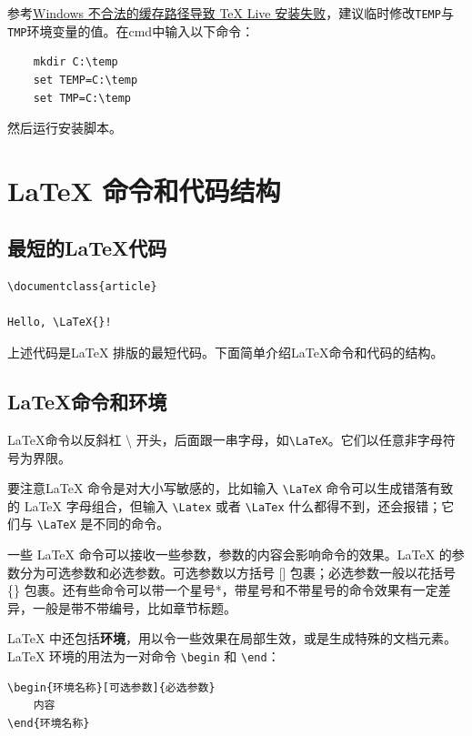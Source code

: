 参考\href{https://syvshc.github.io/2021-04-07-illegal-temp-cause-tlinstall-failure/}{Windows 不合法的缓存路径导致 TeX Live 安装失败}，建议临时修改\lstinline{TEMP}与\lstinline{TMP}环境变量的值。在cmd中输入以下命令：
\begin{lstlisting}
    mkdir C:\temp
    set TEMP=C:\temp
    set TMP=C:\temp
\end{lstlisting}

然后运行安装脚本。

\section{\LaTeX{} 命令和代码结构}\label{sec:latexstructure}
\subsection{最短的\LaTeX{}代码}\label{subsec:shortlatexcode}
\begin{lstlisting}
\documentclass{article}

Hello, \LaTeX{}!

\end{lstlisting}

上述代码是\LaTeX{} 排版的最短代码。下面简单介绍\LaTeX{}命令和代码的结构。

\subsection{\LaTeX{}命令和环境}\label{subsec:latexcommands}

\LaTeX{}命令以反斜杠 \hspace{0.2em}\textbackslash\hspace{0.2em} 开头，后面跟一串字母，如\lstinline{\LaTeX}。它们以任意非字母符号为界限。

要注意\LaTeX{} 命令是对大小写敏感的，比如输入 \lstinline{\LaTeX} 命令可以生成错落有致的 \LaTeX{} 字母组合，但输入 \lstinline{\Latex} 或者 \lstinline{\LaTex} 什么都得不到，还会报错；它们与 \lstinline{\LaTeX} 是不同的命令。

一些 \LaTeX{} 命令可以接收一些参数，参数的内容会影响命令的效果。\LaTeX{} 的参数分为可选参数和必选参数。可选参数以方括号 [] 包裹；必选参数一般以花括号 \{\} 包裹。还有些命令可以带一个星号*，带星号和不带星号的命令效果有一定差异，一般是带不带编号，比如章节标题。

\LaTeX{} 中还包括{\bf 环境}，用以令一些效果在局部生效，或是生成特殊的文档元素。\LaTeX{} 环境的用法为一对命令 \lstinline{\begin} 和 \lstinline{\end}：
\begin{lstlisting}
\begin{环境名称}[可选参数]{必选参数}
    内容
\end{环境名称}
\end{lstlisting}

